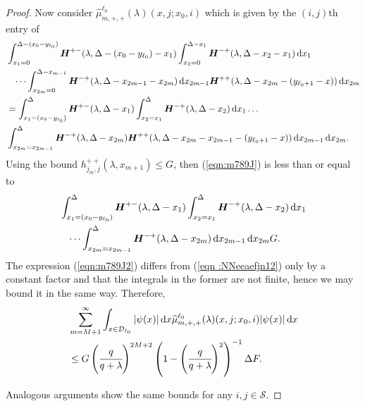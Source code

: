 \begin{proof}
	Now consider \(\widehat\mu_{m,+,+}^{\ell_0}(\lambda)( x,j;x_0,i) \) which is given by the \((i,j)\)th entry of 
	\begin{align}
	\nonumber& \int_{x_1 = 0}^{\Delta-(x_0-y_{\ell_0})} \boldsymbol H^{+-}(\lambda,\Delta-(x_0-y_{\ell_0})-x_1) \int_{x_2 = 0}^{\Delta-x_1} \boldsymbol H^{-+}(\lambda,\Delta - x_2-x_1) \, \mathrm{d} x_1 
	\\\nonumber &\quad\dots  
	\int_{x_{2m}=0}^{\Delta-x_{m-1}} \boldsymbol H^{-+}(\lambda,\Delta -x_{2m-1} - x_{2m}) \, \mathrm{d} x_{2m-1}
		\boldsymbol H^{++}(\lambda,\Delta -x_{2m}- (y_{\ell_0+1}- x))\, \mathrm{d} x_{2m}
	\\\nonumber&= \int_{x_1 = (x_0-y_{\ell_0})}^{\Delta} \boldsymbol H^{+-}(\lambda,\Delta-x_1) \int_{x_2 = x_1}^{\Delta} \boldsymbol H^{-+}(\lambda,\Delta -x_2) \, \mathrm{d} x_1 
	\dots  
	\\&\int_{x_{2m}=x_{2m-1}}^{\Delta} \boldsymbol H^{-+}(\lambda,\Delta - x_{2m}) 
	\boldsymbol H^{++}(\lambda,\Delta -x_{2m}-x_{2m-1}- (y_{\ell_0+1}- x)) 
	\, \mathrm{d} x_{2m-1}\, \mathrm{d} x_{2m}.\label{eqn:m789J}
	\end{align}
	Using the bound \(h^{++}_{j_m,j}(\lambda,x_{m+1})\leq G\), then (\ref{eqn:m789J}) is less than or equal to 
	\begin{align}
			&\int_{x_1 = (x_0-y_{\ell_0})}^{\Delta} \boldsymbol H^{+-}(\lambda,\Delta-x_1) \int_{x_2 = x_1}^{\Delta} \boldsymbol H^{-+}(\lambda,\Delta -x_2) \, \mathrm{d} x_1 \nonumber
	\\&\quad\dots  
	\int_{x_{2m}=x_{2m-1}}^{\Delta} \boldsymbol H^{-+}(\lambda,\Delta - x_{2m})  
	\, \mathrm{d} x_{2m-1}\, \mathrm{d} x_{2m}G.\label{eqn:m789J2}
	\end{align}
	The expression (\ref{eqn:m789J2}) differs from (\ref{eqn :NNeeaefjn12}) only by a constant factor and that the integrals in the former are not finite, hence we may bound it in the same way. Therefore, 
	\begin{align}
			& \sum_{m=M+1}^\infty \int_{x\in\mathcal{D}_{\ell_0}} |\psi(x)|\, \mathrm{d} x \widehat \mu^{\ell_0}_{m,+,+}(\lambda)(x,j;x_0,i) |\psi(x)|\, \mathrm{d} x \nonumber
		\\&\leq G\left(\cfrac{q}{q+\lambda}\right)^{2M+2} \left(1-\left(\cfrac{q}{q+\lambda}\right)^2\right)^{-1}\Delta F.
	\end{align}
        
	Analogous arguments show the same bounds for any \(i,j\in\mathcal S\). 
\end{proof}

